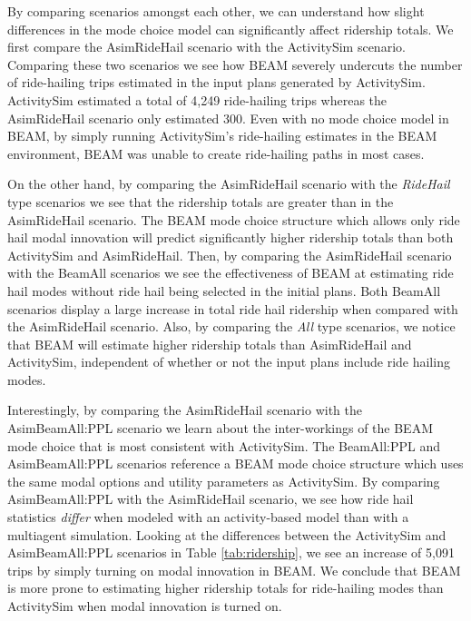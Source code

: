 \documentclass[fancy, masters]{byuthesis}
\begin{document}
By comparing scenarios amongst each other, we can understand how slight differences in the mode choice model can significantly affect ridership totals. We first compare the AsimRideHail scenario with the ActivitySim scenario. Comparing these two scenarios we see how BEAM severely undercuts the number of ride-hailing trips estimated in the input plans generated by ActivitySim. ActivitySim estimated a total of 4,249 ride-hailing trips whereas the AsimRideHail scenario only estimated 300. Even with no mode choice model in BEAM, by simply running ActivitySim's ride-hailing estimates in the BEAM environment, BEAM was unable to create ride-hailing paths in most cases.

On the other hand, by comparing the AsimRideHail scenario with the \emph{RideHail} type scenarios we see that the ridership totals are greater than in the AsimRideHail scenario. The BEAM mode choice structure which allows only ride hail modal innovation will predict significantly higher ridership totals than both ActivitySim and AsimRideHail. Then, by comparing the AsimRideHail scenario with the BeamAll scenarios we see the effectiveness of BEAM at estimating ride hail modes without ride hail being selected in the initial plans. Both BeamAll scenarios display a large increase in total ride hail ridership when compared with the AsimRideHail scenario. Also, by comparing the \emph{All} type scenarios, we notice that BEAM will estimate higher ridership totals than AsimRideHail and ActivitySim, independent of whether or not the input plans include ride hailing modes.

Interestingly, by comparing the AsimRideHail scenario with the AsimBeamAll:PPL scenario we learn about the inter-workings of the BEAM mode choice that is most consistent with ActivitySim. The BeamAll:PPL and AsimBeamAll:PPL scenarios reference a BEAM mode choice structure which uses the same modal options and utility parameters as ActivitySim. By comparing AsimBeamAll:PPL with the AsimRideHail scenario, we see how ride hail statistics \emph{differ} when modeled with an activity-based model than with a multiagent simulation. Looking at the differences between the ActivitySim and AsimBeamAll:PPL scenarios in Table \ref{tab:ridership}, we see an increase of 5,091 trips by simply turning on modal innovation in BEAM. We conclude that BEAM is more prone to estimating higher ridership totals for ride-hailing modes than ActivitySim when modal innovation is turned on.
\end{document}
